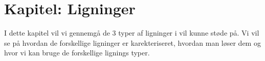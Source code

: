 \section{Kapitel: Ligninger}

I dette kapitel vil vi gennemgå de 3 typer af ligninger i vil kunne støde på. Vi vil se på hvordan de forskellige ligninger er karekteriseret, hvordan man løser dem og hvor vi kan bruge de forskellige lignings typer. 